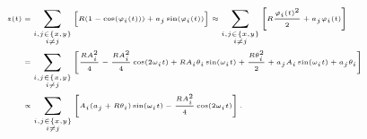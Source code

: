 \documentclass{report}
\numberwithin{tm}{section}
\begin{document}
\begin{align}\tiny
	\begin{aligned}
		z(t) &= \sum_{\substack{i,j \in \{x,y\} \\ i \neq j} }\left[R(1-\cos(\varphi_i(t))) + a_j\sin(\varphi_i(t))\right] \approx \sum_{\substack{i,j \in \{x,y\} \\ i \neq j} }\left[R\frac{\varphi_i(t)^2}{2}+a_j\varphi_i(t)\right] \\
		&= \sum_{\substack{i,j \in \{x,y\} \\ i \neq j} }\left[\frac{RA_i^2}{4}-\frac{RA_i^2}{4}\cos(2\omega_i t) + RA_i\theta_i\sin(\omega_i t)  + \frac{R\theta_i^2}{2}+a_jA_i\sin(\omega_i t) + a_j\theta_i\right] \\
		&\propto \sum_{\substack{i,j \in \{x,y\} \\ i \neq j} }\left[ A_i(a_j + R\theta_i)\sin(\omega_i t) - \frac{RA_i^2}{4}\cos(2\omega_i t)\right].
	\end{aligned}
\end{align}
\end{document}
